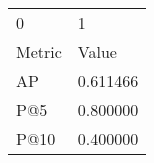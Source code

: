 \begin{tabular}{ll}
0 & 1 \\
Metric & Value \\
AP & 0.611466 \\
P@5 & 0.800000 \\
P@10 & 0.400000 \\
\end{tabular}
